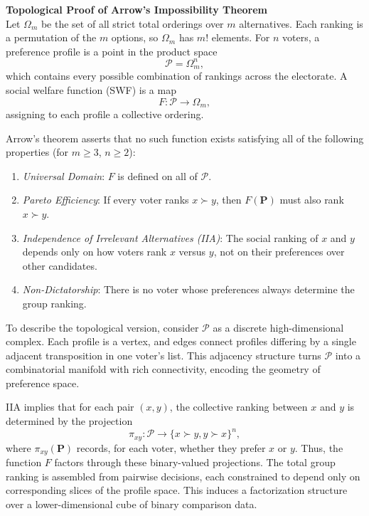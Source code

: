 \begin{technical}
{\Large\textbf{Topological Proof of Arrow’s Impossibility Theorem}}\\[0.7em]

Let \(\Omega_m\) be the set of all strict total orderings over \(m\) alternatives. Each ranking is a permutation of the \(m\) options, so \(\Omega_m\) has \(m!\) elements. For \(n\) voters, a preference profile is a point in the product space
\[
\mathcal{P} = \Omega_m^n,
\]
which contains every possible combination of rankings across the electorate. A social welfare function (SWF) is a map
\[
F : \mathcal{P} \to \Omega_m,
\]
assigning to each profile a collective ordering.

Arrow’s theorem asserts that no such function exists satisfying all of the following properties (for \(m \geq 3\), \(n \geq 2\)):

\begin{enumerate}
    \item \textit{Universal Domain}: \(F\) is defined on all of \(\mathcal{P}\).
    \item \textit{Pareto Efficiency}: If every voter ranks \(x \succ y\), then \(F(\mathbf{P})\) must also rank \(x \succ y\).
    \item \textit{Independence of Irrelevant Alternatives (IIA)}: The social ranking of \(x\) and \(y\) depends only on how voters rank \(x\) versus \(y\), not on their preferences over other candidates.
    \item \textit{Non-Dictatorship}: There is no voter whose preferences always determine the group ranking.
\end{enumerate}

To describe the topological version, consider \(\mathcal{P}\) as a discrete high-dimensional complex. Each profile is a vertex, and edges connect profiles differing by a single adjacent transposition in one voter’s list. This adjacency structure turns \(\mathcal{P}\) into a combinatorial manifold with rich connectivity, encoding the geometry of preference space.

IIA implies that for each pair \((x,y)\), the collective ranking between \(x\) and \(y\) is determined by the projection
\[
\pi_{xy} : \mathcal{P} \to \{ \text{$x \succ y$}, \text{$y \succ x$} \}^n,
\]
where \(\pi_{xy}(\mathbf{P})\) records, for each voter, whether they prefer \(x\) or \(y\). Thus, the function \(F\) factors through these binary-valued projections. The total group ranking is assembled from pairwise decisions, each constrained to depend only on corresponding slices of the profile space. This induces a factorization structure over a lower-dimensional cube of binary comparison data.


\end{technical}
